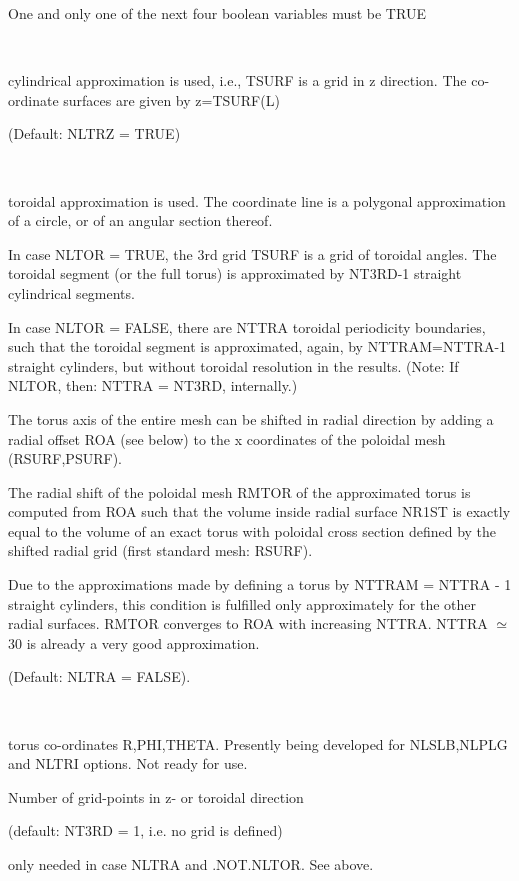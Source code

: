 One and only one of the next four boolean variables must be TRUE
\begin{list}{ }{}
\item[{\bf NLTRZ=TRUE }] ~

cylindrical approximation is used, i.e., TSURF is a grid in z
direction. The co-ordinate surfaces are given by z=TSURF(L)

(Default: NLTRZ = TRUE)

\item[{\bf NLTRA = TRUE }] ~

toroidal approximation is used. The coordinate line is
a polygonal approximation of a circle, or of an angular section thereof.

In case NLTOR = TRUE, the 3rd grid TSURF is a grid of
toroidal angles.
The toroidal segment (or the full torus) is approximated by NT3RD-1 straight cylindrical segments.

In case NLTOR = FALSE, there are NTTRA toroidal periodicity boundaries,
such that the toroidal segment is approximated, again, by NTTRAM=NTTRA-1 straight
cylinders, but without toroidal resolution in the results.
(Note: If NLTOR, then: NTTRA = NT3RD, internally.)

The torus axis of the entire mesh can be shifted in radial
direction by adding a radial offset ROA (see below) to the x
coordinates of the poloidal mesh (RSURF,PSURF).

The radial shift of the poloidal mesh
RMTOR of the approximated torus is computed from ROA
such that the volume
inside radial surface NR1ST is exactly equal to the volume
of an exact torus with poloidal cross section defined by the
shifted radial grid (first standard mesh: RSURF).

Due to the approximations made by
defining a torus by NTTRAM = NTTRA - 1 straight cylinders,
this condition is fulfilled only approximately
for the other radial surfaces. RMTOR converges to ROA with increasing
NTTRA. NTTRA $\simeq$ 30 is already a very good approximation.

(Default: NLTRA = FALSE).
\item[{\bf NLTRT = TRUE }] ~

torus co-ordinates R,PHI,THETA. Presently being developed for
NLSLB,NLPLG and NLTRI options.
Not ready for use.
\item[{\bf NT3RD }]
Number of grid-points in z- or toroidal direction

(default: NT3RD = 1, i.e. no grid is defined)
\item[{\bf NTTRA }]
only needed in case NLTRA and .NOT.NLTOR. See above.
\item[{\bf ZIA,ZGA,ZAA,ZZA,ROA }] ~


\end{list}
